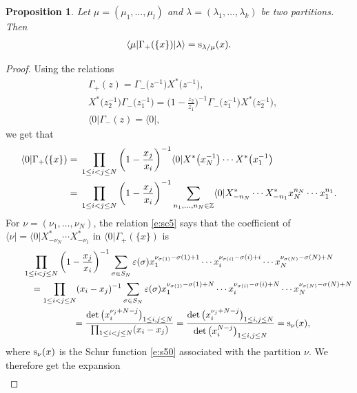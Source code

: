 \documentclass[10pt,a4paper]{amsart}
\numberwithin{equation}{section}
\newtheorem{Proposition}[Theorem]{Proposition}
 { \theoremstyle{definition}
\newtheorem{Definition}[Theorem]{Definition}
\newtheorem{Note}[Theorem]{Note}
\newtheorem{Example}[Theorem]{Example}
\newtheorem{Remark}[Theorem]{Remark} }
\begin{document}
\begin{Proposition}\label{pro10}Let $\mu=(\mu_1, \dots,\mu_l)$ and $\lambda=(\lambda_1, \dots,\lambda_k)$ be two partitions. Then
\begin{align}\label{e:sc6}
\langle\mu|\Gamma_+(\{x\})|\lambda\rangle={\rm s}_{\lambda/\mu}(x).
\end{align}
\end{Proposition}
\begin{proof}
Using the relations
\begin{align*}
&\Gamma_+(z)=\Gamma_-\big(z^{-1}\big)X^*\big(z^{-1}\big),\\
&X^*\big(z_2^{-1}\big)\Gamma_-\big(z^{-1}_1\big)=\bigg(1-\frac{z_2}{z_1}\bigg)^{-1}\Gamma_-\big(z^{-1}_1\big)X^*\big(z_2^{-1}\big),\\
&\langle0|\Gamma_-(z)=\langle0|,
\end{align*}
we get that
\begin{align*}%
\notag\langle0|\Gamma_+(\{x\})={}&\prod_{1\leq i< j\leq N}\bigg(1-\frac{x_j}{x_i}\bigg)^{-1}\langle0|X^*\big(x_N^{-1}\big)\cdots X^*\big(x_1^{-1}\big)\\
={}&\prod_{1\leq i< j\leq N}\bigg(1-\frac{x_j}{x_i}\bigg)^{-1}\sum_{n_1,\dots,n_N\in\mathbb{Z}}\langle0|X^*_{-n_N}\cdots X^*_{-n_1}x^{n_N}_N\cdots x^{n_1}_1.
\end{align*}
For %
$\nu=(\nu_1,\dots,\nu_N)$, the relation \eqref{e:sc5} says that the coefficient of $\langle\nu|=\langle 0|X^*_{-\nu_N}\cdots X^*_{-\nu_1}$ in $\langle0|\Gamma_+(\{x\})$
 is
\begin{gather*}
\prod_{1\leq i<j\leq N}\bigg(1-\frac{x_j}{x_i}\bigg)^{-1}\sum_{\sigma\in S_N}\varepsilon(\sigma)x^{\nu_{\sigma(1)}-\sigma(1)+1}_1\cdots x^{\nu_{\sigma(i)}-\sigma(i)+i}_i\cdots x^{\nu_{\sigma(N)}-\sigma(N)+N}_N\\
 \quad\qquad= \prod_{1\leq i<j\leq N} (x_i-x_j)^{-1}\sum_{\sigma\in S_N}\varepsilon(\sigma)x^{\nu_{\sigma(1)}-\sigma(1)+N}_1\cdots x^{\nu_{\sigma(i)}-\sigma(i)+N}_i\cdots x^{\nu_{\sigma(N)}-\sigma(N)+N}_N\\
 \quad\qquad= \frac{\det\big(x^{\nu_j+N-j}_i\big)_{1\leq i,j\leq N}}{\prod_{1\leq i<j\leq N} (x_i-x_j)}=\frac{\det\big(x^{\nu_j+N-j}_i\big)_{1\leq i,j\leq N}}{\det\big(x^{N-j}_i\big)_{1\leq i,j\leq N}}={\rm s}_\nu(x),
\end{gather*}
where ${\rm s}_\nu(x)$ is the Schur function \eqref{e:s50} associated with the partition $\nu$. We therefore get the expansion
\begin{align}\label{e:sc8}

\end{align}
\end{proof}
\end{document}

